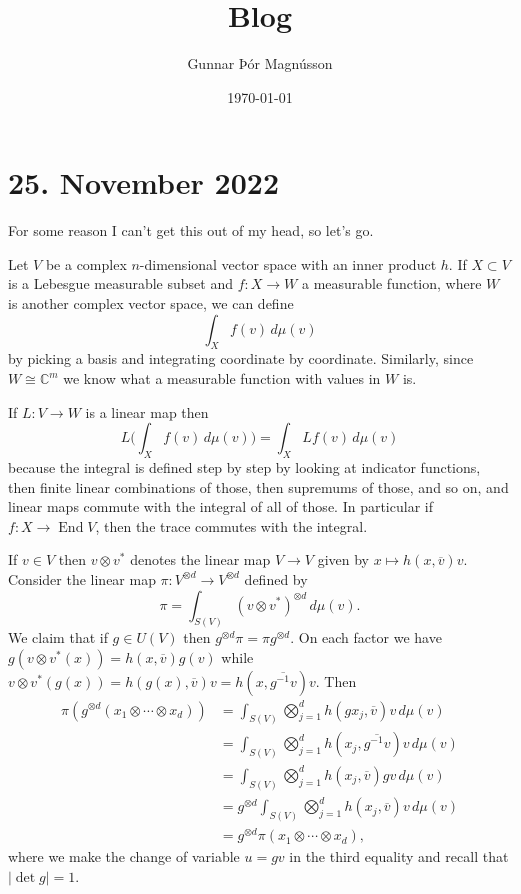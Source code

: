 \documentclass[11pt]{article}
\author{Gunnar Þór Magnússon}
\date{\today}
\title{Blog}
\theoremstyle{definition}
\newcommand{\kk}[1]{\mathbb{#1}}
\def\ov#1{\overline{#1}}
\DeclareMathOperator{\End}{End}
\begin{document}
\maketitle





\section{25. November 2022}

For some reason I can't get this out of my head, so let's go.

Let $V$ be a complex $n$-dimensional vector space with an inner product $h$.
If $X \subset V$ is a Lebesgue measurable subset and $f : X \to W$ a measurable
function, where $W$ is another complex vector space, we can define
$$
\int_X f(v) \, d\mu(v)
$$
by picking a basis and integrating coordinate by coordinate.
Similarly, since $W \cong \kk C^m$ we know what a measurable function with
values in $W$ is.

If $L : V \to W$ is a linear map then
$$
L \biggl( \int_X f(v) \, d\mu(v) \biggr)
= \int_X L f(v) \, d\mu(v)
$$
because the integral is defined step by step by looking at indicator functions,
then finite linear combinations of those, then supremums of those, and so on,
and linear maps commute with the integral of all of those.
In particular if $f : X \to \End V$, then the trace commutes with the integral.

If $v \in V$ then $v \otimes v^*$ denotes the linear map $V \to V$ given by $x
\mapsto h(x, \ov v) v$.
Consider the linear map $\pi : V^{\otimes d} \to V^{\otimes d}$ defined by
$$
\pi = \int_{S(V)} (v \otimes v^*)^{\otimes d} \, d\mu(v).
$$
We claim that if $g \in U(V)$ then $g^{\otimes d} \pi = \pi g^{\otimes d}$.
On each factor we have $g(v\otimes v^*(x)) = h(x,\ov v) g(v)$
while $v \otimes v^*(g(x)) = h(g(x), \ov v) v = h(x, \ov{g^{-1}v}) v$.
Then
\begin{align*}
\pi(g^{\otimes d}(x_1 \otimes \cdots \otimes x_d))
&= \int_{S(V)} \bigotimes_{j=1}^d h(g x_j, \ov v) v \, d\mu(v)
\\
&= \int_{S(V)} \bigotimes_{j=1}^d h(x_j, \ov{g^{-1}v}) v \, d\mu(v)
\\
&= \int_{S(V)} \bigotimes_{j=1}^d h(x_j, \ov{v}) g v \, d\mu(v)
\\
&= g^{\otimes d} \int_{S(V)} \bigotimes_{j=1}^d h(x_j, \ov{v}) v \, d\mu(v)
\\
&= g^{\otimes d} \pi(x_1 \otimes \cdots \otimes x_d),
\end{align*}
where we make the change of variable $u = gv$ in the third equality and recall
that $|\!\det g| = 1$.
\end{document}
